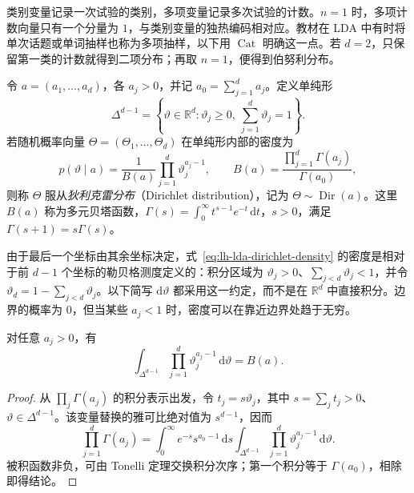类别变量记录一次试验的类别，多项变量记录多次试验的计数。$n=1$ 时，多项计数向量只有一个分量为 $1$，与类别变量的独热编码相对应。教材在 LDA 中有时将单次话题或单词抽样也称为多项抽样，以下用 $\operatorname{Cat}$ 明确这一点。若 $d=2$，只保留第一类的计数就得到二项分布；再取 $n=1$，便得到伯努利分布。

\begin{definition}[狄利克雷分布]
\label{def:lh-lda-dirichlet}
令 $a=(a_1,\ldots,a_d)$，各 $a_j>0$，并记 $a_0=\sum_{j=1}^d a_j$。定义单纯形
\[
\Delta^{d-1}=\left\{\vartheta\in\mathbb R^d:
\vartheta_j\geq0,\ \sum_{j=1}^d\vartheta_j=1\right\}.
\]
若随机概率向量 $\Theta=(\Theta_1,\ldots,\Theta_d)$ 在单纯形内部的密度为
\begin{equation}
p(\vartheta\mid a)=\frac1{B(a)}\prod_{j=1}^d\vartheta_j^{a_j-1},
\qquad
B(a)=\frac{\prod_{j=1}^d\Gamma(a_j)}{\Gamma(a_0)},
\label{eq:lh-lda-dirichlet-density}
\end{equation}
则称 $\Theta$ 服从\emph{狄利克雷分布}（Dirichlet distribution），记为 $\Theta\sim\operatorname{Dir}(a)$。这里 $B(a)$ 称为多元贝塔函数，$\Gamma(s)=\int_0^\infty t^{s-1}e^{-t}\,\mathrm dt$，$s>0$，满足 $\Gamma(s+1)=s\Gamma(s)$。
\end{definition}

由于最后一个坐标由其余坐标决定，式~\eqref{eq:lh-lda-dirichlet-density} 的密度是相对于前 $d-1$ 个坐标的勒贝格测度定义的：积分区域为 $\vartheta_j>0$、$\sum_{j<d}\vartheta_j<1$，并令 $\vartheta_d=1-\sum_{j<d}\vartheta_j$。以下简写 $\mathrm d\vartheta$ 都采用这一约定，而不是在 $\mathbb R^d$ 中直接积分。边界的概率为 $0$，但当某些 $a_j<1$ 时，密度可以在靠近边界处趋于无穷。

\begin{proposition}[归一化积分]
\label{prop:lh-lda-dirichlet-normalization}
对任意 $a_j>0$，有
\begin{equation}
\int_{\Delta^{d-1}}\prod_{j=1}^d\vartheta_j^{a_j-1}\,\mathrm d\vartheta
=B(a).
\label{eq:lh-lda-beta-integral}
\end{equation}
\end{proposition}
\begin{proof}
从 $\prod_j\Gamma(a_j)$ 的积分表示出发，令 $t_j=s\vartheta_j$，其中 $s=\sum_jt_j>0$、$\vartheta\in\Delta^{d-1}$。该变量替换的雅可比绝对值为 $s^{d-1}$，因而
\[
\prod_{j=1}^d\Gamma(a_j)
=\int_0^\infty e^{-s}s^{a_0-1}\,\mathrm ds
\int_{\Delta^{d-1}}\prod_{j=1}^d\vartheta_j^{a_j-1}\,\mathrm d\vartheta.
\]
被积函数非负，可由 Tonelli 定理交换积分次序；第一个积分等于 $\Gamma(a_0)$，相除即得结论。
\end{proof}

